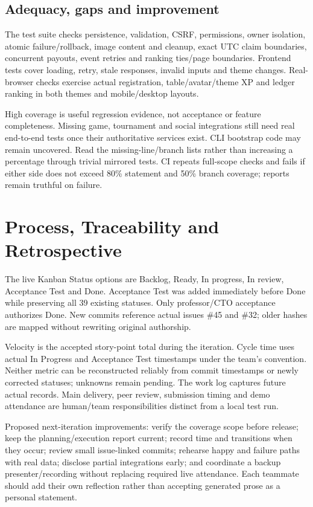 \documentclass[11pt,a4paper]{article}
\begin{document}
\subsection{Adequacy, gaps and improvement}
The test suite checks persistence, validation, CSRF, permissions, owner isolation, atomic failure/rollback, image content and cleanup, exact UTC claim boundaries, concurrent payouts, event retries and ranking ties/page boundaries. Frontend tests cover loading, retry, stale responses, invalid inputs and theme changes. Real-browser checks exercise actual registration, table/avatar/theme XP and ledger ranking in both themes and mobile/desktop layouts.

High coverage is useful regression evidence, not acceptance or feature completeness. Missing game, tournament and social integrations still need real end-to-end tests once their authoritative services exist. CLI bootstrap code may remain uncovered. Read the missing-line/branch lists rather than increasing a percentage through trivial mirrored tests. CI repeats full-scope checks and fails if either side does not exceed 80\% statement and 50\% branch coverage; reports remain truthful on failure.

\section{Process, Traceability and Retrospective}
The live Kanban Status options are Backlog, Ready, In progress, In review, Acceptance Test and Done. Acceptance Test was added immediately before Done while preserving all 39 existing statuses. Only professor/CTO acceptance authorizes Done. New commits reference actual issues \#45 and \#32; older hashes are mapped without rewriting original authorship.

Velocity is the accepted story-point total during the iteration. Cycle time uses actual In Progress and Acceptance Test timestamps under the team's convention. Neither metric can be reconstructed reliably from commit timestamps or newly corrected statuses; unknowns remain pending. The work log captures future actual records. Main delivery, peer review, submission timing and demo attendance are human/team responsibilities distinct from a local test run.

Proposed next-iteration improvements: verify the coverage scope before release; keep the planning/execution report current; record time and transitions when they occur; review small issue-linked commits; rehearse happy and failure paths with real data; disclose partial integrations early; and coordinate a backup presenter/recording without replacing required live attendance. Each teammate should add their own reflection rather than accepting generated prose as a personal statement.
\end{document}
